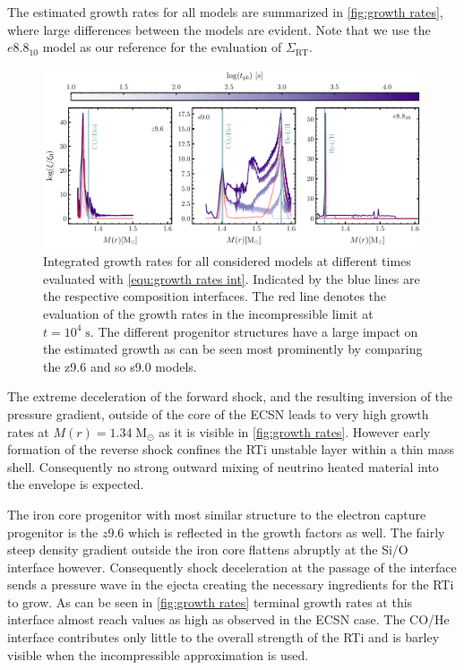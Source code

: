 \documentclass[fleqn,usenatbib]{mnras}
\begin{document}
The estimated growth rates for all models are summarized in \autoref{fig:growth rates}, where large differences between the models are evident. Note that we use the $e8.8_{10}$ model as our reference for the evaluation of $\Sigma_{\mathrm{RT}}$.

\begin{figure}
 \centering
 \includegraphics[width=\textwidth]{pic/growth_rates_1d.pdf}
 \caption{Integrated growth rates for all considered models at different times evaluated with \autoref{equ:growth rates int}. Indicated by the blue lines are the respective composition interfaces. The red line denotes the evaluation of the growth rates in the incompressible limit at $t=10^{4}\;\mathrm{s}$. The different progenitor structures have a large impact on the estimated growth as can be seen most prominently by comparing the z9.6 and so s9.0 models. }
 \label{fig:growth rates}
\end{figure}

The extreme deceleration of the forward shock, and the resulting inversion of the pressure gradient, outside of the core of the ECSN leads to very high growth rates at $M(r)=1.34\;\mathrm{M_{\odot}}$ as it is visible in \autoref{fig:growth rates}. However early formation of the reverse shock confines the RTi unstable layer within a thin mass shell. Consequently no strong outward mixing of neutrino heated material into the envelope is expected.

The iron core progenitor with most similar structure to the electron capture progenitor is the $z9.6$ which is reflected in the growth factors as well.
The fairly steep density gradient outside the iron core flattens abruptly at the Si/O interface however. Consequently shock deceleration at the passage of the interface sends a pressure wave in the ejecta creating the necessary ingredients for the RTi to grow. As can be seen in \autoref{fig:growth rates} terminal growth rates at this interface almost reach values as high as observed in the ECSN case. The CO/He interface contributes only little to the overall strength of the RTi and is barley visible when the incompressible approximation is used.
\end{document}
